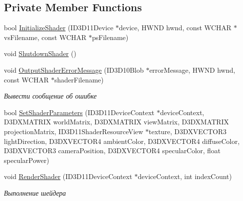 \subsection*{Private Member Functions}
\begin{DoxyCompactItemize}
\item 
bool \hyperlink{class_model_shader_class_ac0848d724234e07aee2f9ee713839ad2}{Initialize\+Shader} (I\+D3\+D11\+Device $\ast$device, H\+W\+ND hwnd, const W\+C\+H\+AR $\ast$vs\+Filename, const W\+C\+H\+AR $\ast$ps\+Filename)
\item 
void \hyperlink{class_model_shader_class_a7a8d03ca2f55a8032ad02e648c2587a3}{Shutdown\+Shader} ()
\item 
void \hyperlink{class_model_shader_class_a4152702fb1740e700c9ad97e82ab3739}{Output\+Shader\+Error\+Message} (I\+D3\+D10\+Blob $\ast$error\+Message, H\+W\+ND hwnd, const W\+C\+H\+AR $\ast$shader\+Filename)
\begin{DoxyCompactList}\small\item\em Вывести сообщение об ошибке \end{DoxyCompactList}\item 
bool \hyperlink{class_model_shader_class_a381f4da444ab26ae37d383580e3528c5}{Set\+Shader\+Parameters} (I\+D3\+D11\+Device\+Context $\ast$device\+Context, D3\+D\+X\+M\+A\+T\+R\+IX world\+Matrix, D3\+D\+X\+M\+A\+T\+R\+IX view\+Matrix, D3\+D\+X\+M\+A\+T\+R\+IX projection\+Matrix, I\+D3\+D11\+Shader\+Resource\+View $\ast$texture, D3\+D\+X\+V\+E\+C\+T\+O\+R3 light\+Direction, D3\+D\+X\+V\+E\+C\+T\+O\+R4 ambient\+Color, D3\+D\+X\+V\+E\+C\+T\+O\+R4 diffuse\+Color, D3\+D\+X\+V\+E\+C\+T\+O\+R3 camera\+Position, D3\+D\+X\+V\+E\+C\+T\+O\+R4 specular\+Color, float specular\+Power)
\item 
void \hyperlink{class_model_shader_class_a7831409d29e5923e090255d2b2c080c2}{Render\+Shader} (I\+D3\+D11\+Device\+Context $\ast$device\+Context, int index\+Count)
\begin{DoxyCompactList}\small\item\em Выполнение шейдера \end{DoxyCompactList}\end{DoxyCompactItemize}
